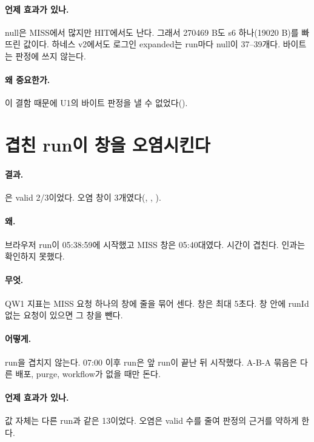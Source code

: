 \paragraph{언제 효과가 있나.}
null은 MISS에서 많지만 HIT에서도 난다. 그래서 270469 B도 s6 하나(19020 B)를 빠뜨린 값이다.
하네스 v2에서도 로그인 expanded는 run마다 null이 37--39개다. 바이트는 판정에 쓰지 않는다.

\paragraph{왜 중요한가.}
이 결함 때문에 U1의 바이트 판정을 낼 수 없었다().

\section{겹친 run이 창을 오염시킨다}\label{sec:le-overlap}

\paragraph{결과.}
은 valid 2/3이었다. 오염 창이 3개였다(, , ).

\paragraph{왜.}
브라우저 run이 05:38:59에 시작했고 MISS 창은 05:40대였다. 시간이 겹친다.
인과는 확인하지 못했다.

\paragraph{무엇.}
QW1 지표는 MISS 요청 하나의 창에  줄을 묶어 센다. 창은 최대 5초다.
창 안에 runId 없는 요청이 있으면 그 창을 뺀다.

\paragraph{어떻게.}
run을 겹치지 않는다. 07:00 이후 run은 앞 run이 끝난 뒤 시작했다.
A-B-A 묶음은 다른 배포, purge, workflow가 없을 때만 돈다.

\paragraph{언제 효과가 있나.}
값 자체는 다른 run과 같은 13이었다. 오염은 valid 수를 줄여 판정의 근거를 약하게 한다.

